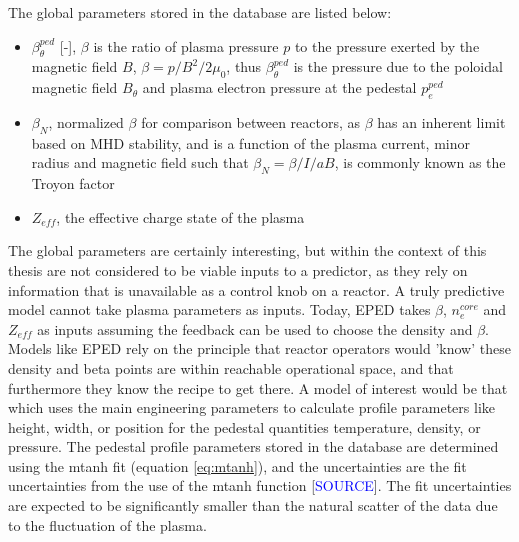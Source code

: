 \documentclass[a4paper, twoside, final, 12pt]{article}
\begin{document}
The global parameters stored in the database are listed below: 
\begin{itemize}
	\item $\beta_\theta^{ped}$ [-], $\beta$ is the ratio of plasma pressure $p$ to the pressure exerted by the magnetic field $B$, $\beta = p / B^2 / 2\mu_0$, thus $\beta_\theta^{ped}$ is the pressure due to the poloidal magnetic field $B_\theta$ and plasma electron pressure at the pedestal $p_e^{ped}$
	\item $\beta_N$, normalized $\beta$ for comparison between reactors, as $\beta$ has an inherent limit based on MHD stability, and is a function of the plasma current, minor radius and magnetic field such that $\beta_N = \beta / I / aB$, is commonly known as the Troyon factor
	\item $Z_{eff}$, the effective charge state of the plasma
\end{itemize}

The global parameters are certainly interesting, but within the context of this thesis are not considered to be viable inputs to a predictor, as they rely on information that is unavailable as a control knob on a reactor.
A truly predictive model cannot take plasma parameters as inputs. Today, EPED takes $\beta$, $n_e^{core}$ and $Z_{eff}$ as inputs assuming the feedback can be used to choose the density and $\beta$.
Models like EPED rely on the principle that reactor operators would 'know' these density and beta points are within reachable operational space, and that furthermore they know the recipe to get there.
A model of interest would be that which uses the main engineering parameters to calculate profile parameters like height, width, or position for the pedestal quantities temperature, density, or pressure.
The pedestal profile parameters stored in the database are determined using the mtanh fit (equation \ref{eq:mtanh}), and the uncertainties are the fit uncertainties from the use of the mtanh function [\textcolor{blue}{SOURCE}].
The fit uncertainties are expected to be significantly smaller than the natural scatter of the data due to the fluctuation of the plasma.
\end{document}
